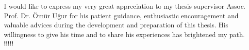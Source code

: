 I would like to express my very great appreciation to my thesis supervisor Assoc. Prof. Dr. \"Om\"ur U{\u{g}}ur for his patient guidance, enthusiastic encouragement and valuable advices during the development and preparation of this thesis. His willingness to give his time and to share his experiences has brightened my path.
!!!!!

